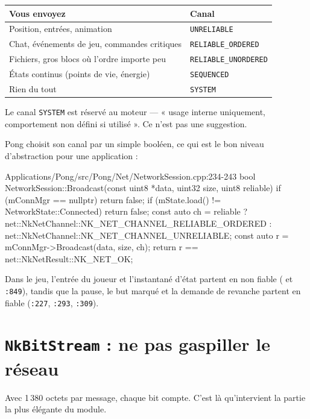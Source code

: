 \begin{center}
\begin{tabular}{@{}ll@{}}
\toprule
\textbf{Vous envoyez} & \textbf{Canal} \\
\midrule
Position, entrées, animation & \texttt{UNRELIABLE} \\
Chat, événements de jeu, commandes critiques & \texttt{RELIABLE\_ORDERED} \\
Fichiers, gros blocs où l'ordre importe peu & \texttt{RELIABLE\_UNORDERED} \\
États continus (points de vie, énergie) & \texttt{SEQUENCED} \\
Rien du tout & \texttt{SYSTEM} \\
\bottomrule
\end{tabular}
\end{center}

Le canal \texttt{SYSTEM} est réservé au moteur — « usage interne uniquement,
comportement non défini si utilisé ». Ce n'est pas une suggestion.

Pong choisit son canal par un simple booléen, ce qui est le bon niveau
d'abstraction pour une application :

\begin{nkcode}{Applications/Pong/src/Pong/Net/NetworkSession.cpp:234-243}
        bool NetworkSession::Broadcast(const uint8 *data, uint32 size, uint8 reliable) {
            if (mConnMgr == nullptr)
                return false;
            if (mState.load() != NetworkState::Connected)
                return false;
            const auto ch = reliable ? net::NkNetChannel::NK_NET_CHANNEL_RELIABLE_ORDERED
                                     : net::NkNetChannel::NK_NET_CHANNEL_UNRELIABLE;
            const auto r = mConnMgr->Broadcast(data, size, ch);
            return r == net::NkNetResult::NK_NET_OK;
        }
\end{nkcode}

Dans le jeu, l'entrée du joueur et l'instantané d'état partent en non fiable
( et \texttt{:849}), tandis que la pause, le but
marqué et la demande de revanche partent en fiable (\texttt{:227}, \texttt{:293},
\texttt{:309}).

\section{\texttt{NkBitStream} : ne pas gaspiller le réseau}

Avec 1\,380 octets par message, chaque bit compte. C'est là qu'intervient la
partie la plus élégante du module.


